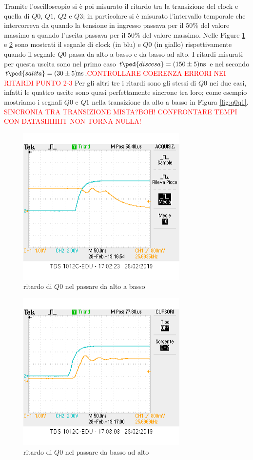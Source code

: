 \documentclass[10pt,a4paper]{article}
\begin{document}
Tramite l'oscilloscopio si è poi misurato il ritardo tra la transizione del clock e quella di $Q0$, $Q1$, $Q2$ e $Q3$; in particolare si è misurato l'intervallo temporale che intercorreva da quando la tensione in ingresso passava per il $50\%$ del valore massimo a quando l'uscita passava per  il $50\%$ del valore massimo. Nelle Figure \ref{fig:t1} e \ref{fig:t2} sono mostrati il segnale di clock (in blu) e $Q0$ (in giallo) rispettivamente quando il segnale  $Q0$ passa da alto a basso e da basso ad alto. I ritardi misurati per questa uscita 
sono nel primo caso $t\ped{discesa} = (150 \pm 5)\si{\nano\second}$ e nel secondo  $t\ped{salita} = (30 \pm 5)\si{\nano\second}$.\textcolor{red}{CONTROLLARE COERENZA ERRORI NEI RITARDI PUNTO 2-3}
Per gli altri tre i ritardi sono gli stessi di $Q0$  nei due casi, infatti le quattro uscite sono quasi perfettamente sincrone tra loro; come esempio  mostriamo  i segnali $Q0$ e $Q1$ nella transizione da alto a basso in Figura \ref{fig:q0q1}.
\textcolor{red}{SINCRONIA TRA TRANSIZIONE MISTA?BOH!}
\textcolor{red}{CONFRONTARE TEMPI CON DATASHIIIIIT NON TORNA NULLA!}
\begin{figure}[h]
			\centering
			\includegraphics[scale=0.85]{tcounter}
			\caption{ritardo di $Q0$ nel passare da alto a basso}
			\label{fig:t1}
\end{figure}
\begin{figure}[h]
			\centering
			\includegraphics[scale=0.85]{tcounter_1}
			\caption{ritardo di $Q0$ nel passare da basso ad alto}
			\label{fig:t2}
\end{figure}
\end{document}
